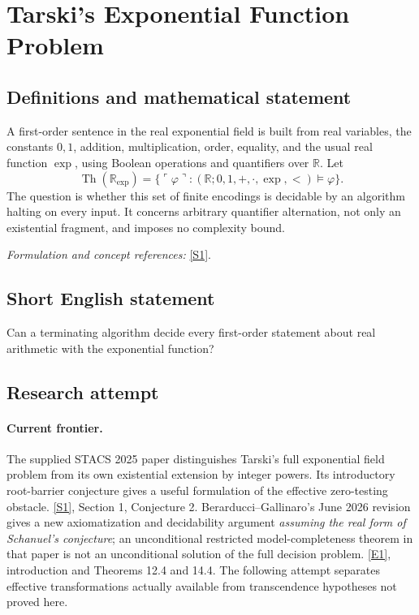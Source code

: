 \documentclass[11pt,a4paper]{article}
\newcommand{\R}{\mathbb{R}}
\newcommand{\sref}[2]{\hyperlink{source:#1:#2}{[S#2]}}
\newcommand{\eref}[2]{\hyperlink{extra:#1:#2}{[E#2]}}
\newif\ifshowcatalogue
\newcommand{\cataloguescope}[1]{\ifshowcatalogue
 \paragraph{Exact scope in the supplied catalogue.}
 \begin{quote}\small #1\end{quote}\fi}
\numberwithin{equation}{section}
\begin{document}
\setcounter{section}{0}
\clearpage
\section*{\texorpdfstring{Tarski's Exponential Function Problem}{Tarski's Exponential Function Problem}}\label{1462}
\subsection{Definitions and mathematical statement}
A first-order sentence in the real exponential field is built from real variables, the constants $0,1$, addition, multiplication, order, equality, and the usual real function $\exp$, using Boolean operations and quantifiers over $\R$. Let
\[
 \operatorname{Th}(\R_{\exp})=\{\ulcorner\varphi\urcorner:(\R;0,1,+,\cdot,\exp,<)\models\varphi\}.
\]
The question is whether this set of finite encodings is decidable by an algorithm halting on every input. It concerns arbitrary quantifier alternation, not only an existential fragment, and imposes no complexity bound.
\par\smallskip\textit{Formulation and concept references:} \sref{1462}{1}.
\cataloguescope{Determine whether the first-order theory of the real exponential field (R; 0, 1, +, *, exp, <, =) is decidable.}
\subsection{Short English statement}
Can a terminating algorithm decide every first-order statement about real arithmetic with the exponential function?
\subsection{Research attempt}

\paragraph{Current frontier.}
The supplied STACS 2025 paper distinguishes Tarski's full exponential
field problem from its own existential extension by integer powers.
Its introductory root-barrier conjecture gives a useful formulation of
the effective zero-testing obstacle. \sref{1462}{1}, Section 1,
Conjecture 2.
Berarducci--Gallinaro's June 2026 revision gives a new axiomatization and
decidability argument \emph{assuming the real form of Schanuel's
conjecture}; an unconditional restricted model-completeness theorem in
that paper is not an unconditional solution of the full decision
problem. \eref{1462}{1}, introduction and Theorems 12.4 and 14.4.
The following attempt separates effective transformations actually
available from transcendence hypotheses not proved here.
\end{document}
